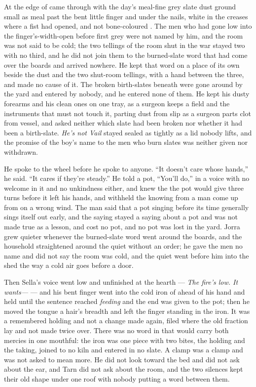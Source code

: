 At the edge of   came through with the day's meal-fine grey slate dust ground small as meal past the bent little finger and under the nails, white in the creases where a fist had opened, and not bone-coloured . The men who had gone low into the finger's-width-open  before first grey were not named by him, and the room was not said to be cold; the two tellings of the room shut in the war stayed two with no third, and he did not join them to the burned-slate word that had come over the boards and arrived nowhere. He kept that word on a place of its own beside the dust and the two shut-room tellings, with a hand between the three, and made no cause of it. The broken birth-slates beneath  were gone around by the yard and entered by nobody, and he entered none of them. He kept his dusty forearms and his clean ones on one tray, as a surgeon keeps a field and the instruments that must not touch it, parting dust from slip as a surgeon parts clot from vessel, and asked neither which slate had been broken nor whether it had been a birth-slate. \emph{He's not Vail} stayed sealed as tightly as a lid nobody lifts, and the promise of the boy's name to the men who burn slates was neither given nor withdrawn.

He spoke to the wheel before he spoke to anyone. “It doesn't care whose hands,” he said. “It cares if they're steady.” He told a pot, “You'll do,” in a voice with no welcome in it and no unkindness either, and knew the  the pot would give three turns before it left his hands, and withheld the knowing from a man come up from  on a wrong wind. The man said that a pot singing before its time generally sings itself out early, and the saying stayed a saying about a pot and was not made true as a lesson, and cost no pot, and no pot was lost in the yard. Jorra grew quieter whenever the burned-slate word went around the boards, and the household straightened around the quiet without an order; he gave the men no name and did not say the room was cold, and the quiet went before him into the shed the way a cold air goes before a door.

Then Sella's voice went low and unfinished at the hearth --- \emph{The fire's low. It wants---} --- and his bent finger went into the cold iron of  ahead of his hand and held until the sentence reached \emph{feeding} and the end was given to the pot; then he moved the tongue a hair's breadth and left the finger standing in the iron. It was a remembered holding and not a change made again, filed where the old fraction lay and not made twice over. There was no word in  that would carry both mercies in one mouthful: the iron was one piece with two bites, the holding and the taking, joined to no kiln and entered in no slate. A clamp was a clamp and was not asked to mean more. He did not look toward the bed and did not ask about the ear, and Tarn did not ask about the room, and the two silences kept their old shape under one roof with nobody putting a word between them.

